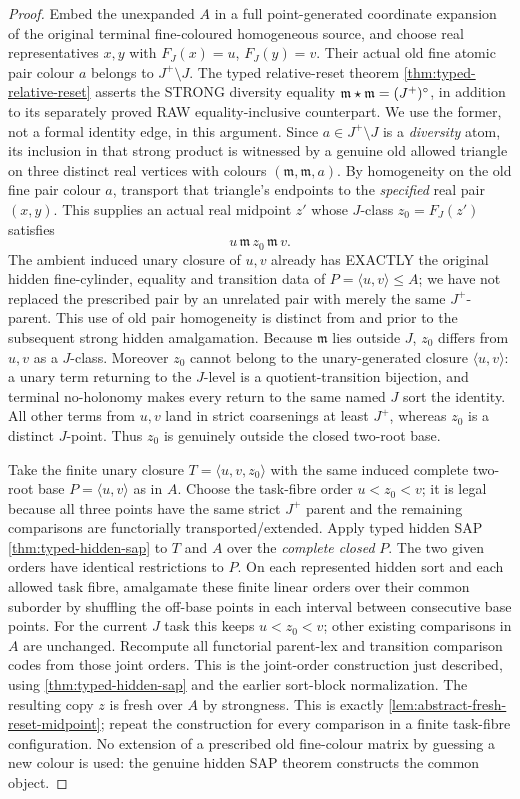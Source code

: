 \begin{proof}
Embed the unexpanded $A$ in a full point-generated
coordinate expansion of the original terminal
fine-coloured homogeneous source, and choose
real representatives $x,y$ with
$F_J(x)=u$, $F_J(y)=v$. Their actual old
fine atomic pair colour $a$ belongs to
$J^+\setminus J$. The typed relative-reset theorem
\cref{thm:typed-relative-reset}
asserts the STRONG diversity equality
\(\mathfrak m\mathbin\star\mathfrak m=(J^+)^\circ\),
in addition to its separately proved
RAW equality-inclusive counterpart.
We use the former, not a formal
identity edge, in this argument. Since
$a\in J^+\setminus J$ is a \emph{diversity}
atom, its inclusion in that strong product
is witnessed by a genuine old allowed
triangle on three distinct real vertices
with colours $(\mathfrak m,\mathfrak m,a)$.
By homogeneity on the old fine pair colour
$a$, transport that triangle's endpoints to
the \emph{specified} real pair $(x,y)$.
This supplies an actual real midpoint $z'$
whose $J$-class $z_0=F_J(z')$ satisfies
\[
          u\,\mathfrak m\,z_0\,\mathfrak m\,v.
\]
The ambient induced unary closure of $u,v$
already has EXACTLY the original hidden
fine-cylinder, equality and transition data
of $P=\langle u,v\rangle\le A$; we have
not replaced the prescribed pair by an
unrelated pair with merely the same
$J^+$-parent. This use of old pair
homogeneity is distinct from and prior to
the subsequent strong hidden amalgamation.
Because $\mathfrak m$ lies outside $J$,
$z_0$ differs from $u,v$ as a $J$-class.
Moreover $z_0$ cannot belong to the
unary-generated closure $\langle u,v\rangle$:
a unary term returning to the $J$-level
is a quotient-transition bijection, and
terminal no-holonomy makes every return
to the same named $J$ sort the identity.
All other terms from $u,v$ land in
strict coarsenings at least $J^+$,
whereas $z_0$ is a distinct $J$-point.
Thus $z_0$ is genuinely outside the
closed two-root base.

Take the finite unary closure
$T=\langle u,v,z_0\rangle$ with the same
induced complete two-root base
$P=\langle u,v\rangle$ as in $A$.
Choose the task-fibre order $u<z_0<v$;
it is legal because all three points
have the same strict $J^+$ parent and
the remaining comparisons are
functorially transported/extended.
Apply typed hidden SAP
\cref{thm:typed-hidden-sap} to $T$ and
$A$ over the \emph{complete closed} $P$.
The two given orders have identical
restrictions to $P$. On each represented
hidden sort and each allowed task fibre,
amalgamate these finite linear orders
over their common suborder by shuffling
the off-base points in each interval
between consecutive base points.
For the current $J$ task this keeps
$u<z_0<v$; other existing comparisons
in $A$ are unchanged. Recompute all
functorial parent-lex and transition
comparison codes from those joint
orders. This is the joint-order construction just described, using
\cref{thm:typed-hidden-sap} and the earlier sort-block normalization.
The resulting copy $z$ is fresh over
$A$ by strongness. This is exactly
\cref{lem:abstract-fresh-reset-midpoint};
repeat the construction for every
comparison in a finite task-fibre
configuration. No extension of a
prescribed old fine-colour matrix by
guessing a new colour is used:
the genuine hidden SAP theorem
constructs the common object.


\end{proof}
